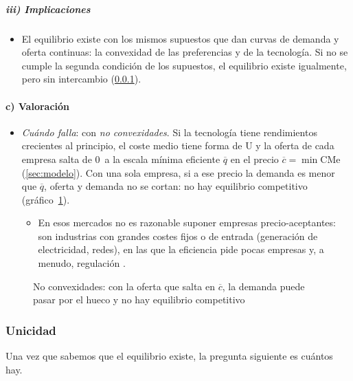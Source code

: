 \documentclass[11pt]{article}
\begin{document}
\subparagraph{iii) Implicaciones}

\begin{itemize}
\item El equilibrio existe con los mismos supuestos que dan curvas de demanda y oferta continuas: la convexidad de las preferencias y de la tecnología. Si no se cumple la segunda condición de los supuestos, el equilibrio existe igualmente, pero sin intercambio (\ref{sec:unicidad}).
\end{itemize}

\paragraph{c) Valoración}

\begin{itemize}
\item \emph{Cuándo falla}: con \emph{no convexidades}. Si la tecnología tiene rendimientos crecientes al principio, el coste medio tiene forma de U y la oferta de cada empresa salta de 0~a la escala mínima eficiente $\overline{q}$ en el precio $\overline{c}=\min\mathrm{CMe}$ (\ref{sec:modelo}). Con una sola empresa, si a ese precio la demanda es menor que $\overline{q}$, oferta y demanda no se cortan: no hay equilibrio competitivo (gráfico~\ref{fig:no-convexidad}).
  \begin{itemize}
  \item En esos mercados no es razonable suponer empresas precio-aceptantes: son industrias con grandes costes fijos o de entrada (generación de electricidad, redes), en las que la eficiencia pide pocas empresas y, a menudo, regulación  .
  \end{itemize}
\end{itemize}

\begin{figure}[H]
\centering
\caption{No convexidades: con la oferta que salta en $\overline{c}$, la demanda puede pasar por el hueco y no hay equilibrio competitivo}\label{fig:no-convexidad}
\end{figure}

\subsubsection{Unicidad}\label{sec:unicidad}

Una vez que sabemos que el equilibrio existe, la pregunta siguiente es cuántos hay.
\end{document}
